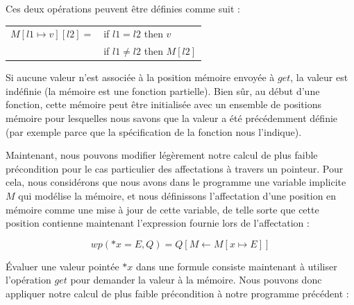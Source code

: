 Ces deux opérations peuvent être définies comme suit :


\begin{tabular}{ll}
  $M[l1 \mapsto v][l2] =$ & if $l1   =  l2$ then $v$ \\
                          & if $l1 \neq l2$ then $M[l2]$
\end{tabular}


Si aucune valeur n'est associée à la position mémoire envoyée à $get$,
la valeur est indéfinie (la mémoire est une fonction partielle). Bien sûr, au début
d'une fonction, cette mémoire peut être initialisée avec un ensemble de positions mémoire
pour lesquelles nous savons que la valeur a été précédemment définie (par exemple
parce que la spécification de la fonction nous l'indique).


Maintenant, nous pouvons modifier légèrement notre calcul de plus faible précondition
pour le cas particulier des affectations à travers un pointeur. Pour cela, nous
considérons que nous avons dans le programme une variable implicite $M$ qui modélise
la mémoire, et nous définissons l'affectation d'une position en mémoire comme une mise
à jour de cette variable, de telle sorte que cette position contienne maintenant
l'expression fournie lors de l'affectation :

$$wp(*x = E, Q) = Q[M \leftarrow M[x \mapsto E]]$$

Évaluer une valeur pointée $*x$ dans une formule consiste maintenant à utiliser
l'opération $get$ pour demander la valeur à la mémoire. Nous pouvons donc
appliquer notre calcul de plus faible précondition à notre programme précédent :

